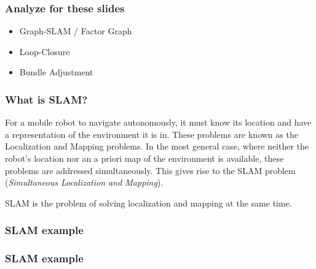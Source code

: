\begin{frame}
    \frametitle{Analyze for these slides}
    
    \begin{itemize}
    \item Graph-SLAM / Factor Graph
    \item Loop-Closure
    \item Bundle Adjustment
    \end{itemize}
    
    \end{frame}
    
    \begin{frame}
    \frametitle{What is SLAM?}
    
    For a mobile robot to navigate autonomously, it must know its location and have a representation of the environment it is in. These problems are known as the Localization and Mapping problems. In the most general case, where neither the robot's location nor an a priori map of the environment is available, these problems are addressed simultaneously. This gives rise to the SLAM problem (\emph{Simultaneous Localization and Mapping}).
    \begin{block}{}
    SLAM is the problem of solving localization and mapping at the same time.
    \end{block}
    
    \end{frame}
    
    
    \begin{frame}
     \frametitle{SLAM example}
    
     \begin{figure}
     \hfill{}
     \end{figure}
    
    \end{frame}
    
    \begin{frame}
     \frametitle{SLAM example}
     \begin{figure}
     \hfill{}
     \end{figure}
    
    \end{frame}
    
